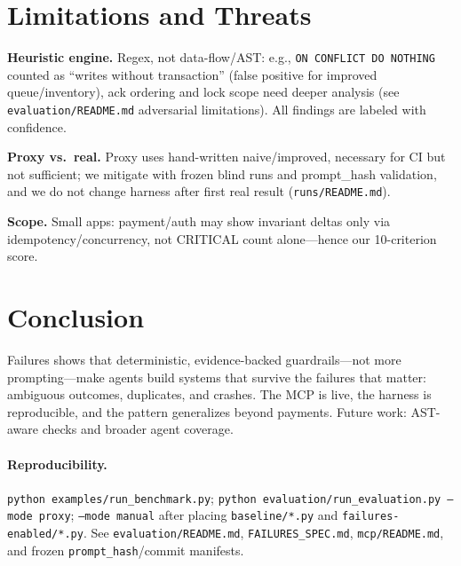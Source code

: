 \section{Limitations and Threats}
\textbf{Heuristic engine.} Regex, not data-flow/AST: e.g., \texttt{ON CONFLICT DO NOTHING} counted as ``writes without transaction'' (false positive for improved queue/inventory), ack ordering and lock scope need deeper analysis (see \texttt{evaluation/README.md} adversarial limitations). All findings are labeled with confidence.

\textbf{Proxy vs.\ real.} Proxy uses hand-written naive/improved, necessary for CI but not sufficient; we mitigate with frozen blind runs and prompt\_hash validation, and we do not change harness after first real result (\texttt{runs/README.md}).

\textbf{Scope.} Small apps: payment/auth may show invariant deltas only via idempotency/concurrency, not CRITICAL count alone---hence our 10-criterion score.

\section{Conclusion}
Failures shows that deterministic, evidence-backed guardrails---not more prompting---make agents build systems that survive the failures that matter: ambiguous outcomes, duplicates, and crashes. The MCP is live, the harness is reproducible, and the pattern generalizes beyond payments. Future work: AST-aware checks and broader agent coverage.

\paragraph{Reproducibility.} \texttt{python examples/run\_benchmark.py}; \texttt{python evaluation/run\_evaluation.py --mode proxy}; \texttt{--mode manual} after placing \texttt{baseline/*.py} and \texttt{failures-enabled/*.py}. See \texttt{evaluation/README.md}, \texttt{FAILURES\_SPEC.md}, \texttt{mcp/README.md}, and frozen \texttt{prompt\_hash}/commit manifests.

